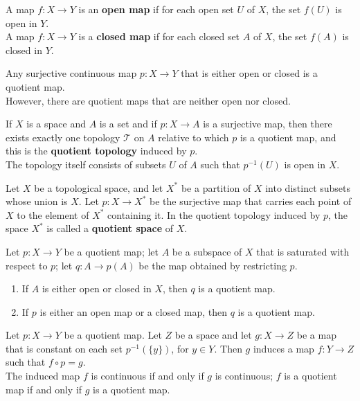 \begin{definition}
A map $f \colon  X \rightarrow Y$ is an \textbf{open map} if for each open set $U$ of $X$, the set $f(U)$ is open in $Y$. \\

A map $f \colon  X \rightarrow Y$ is a \textbf{closed map} if for each closed set $A$ of $X$, the set $f(A)$ is closed in $Y$.
\end{definition}

\begin{remark}
Any surjective continuous map $p\colon X \rightarrow Y$ that is either open or closed is a quotient map. \\

However, there are quotient maps that are neither open nor closed.
\end{remark}

\begin{definition}
If $X$ is a space and $A$ is a set and if $p \colon X \rightarrow A$ is a surjective map, then there exists exactly one topology $\mathscr{T}$ on $A$ relative to which
$p$ is a quotient map, and this is the \textbf{quotient topology} induced by $p$. \\

The topology itself consists of subsets $U$ of $A$ such that $p^{-1}(U)$ is open in $X$.
\end{definition}

\begin{definition}
Let $X$ be a topological space, and let $X^*$ be a partition of $X$ into distinct subsets whose union is $X$. Let $p \colon  X \rightarrow  X^*$ be the surjective map that
carries each point of $X$ to the element of $X^*$ containing it. In the quotient topology induced by $p$, the space $X^*$ is called a \textbf{quotient space} of $X$.
\end{definition}

\begin{theorem}
Let $p\colon X \rightarrow Y$ be a quotient map; let $A$ be a subspace of $X$ that is saturated with respect to $p$; let $q \colon A \rightarrow p(A)$ be the map obtained by restricting $p$.
\begin{enumerate}
    \item If $A$ is either open or closed in $X$, then $q$ is a quotient map.
    \item If $p$ is either an open map or a closed map, then $q$ is a quotient map.
\end{enumerate}
\end{theorem}

\begin{theorem}
Let $p \colon X \rightarrow Y$ be a quotient map. Let $Z$ be a space and let $g\colon X \rightarrow Z$ be a map that is constant on each set $p^{-1}(\{ y \})$, for $y \in Y$.
Then $g$ induces a map $f\colon Y \rightarrow Z$ such that $f \circ p = g$. \\

The induced map $f$ is continuous if and only if $g$ is continuous; $f$ is a quotient map if and only if $g$ is a quotient map.
\end{theorem}

